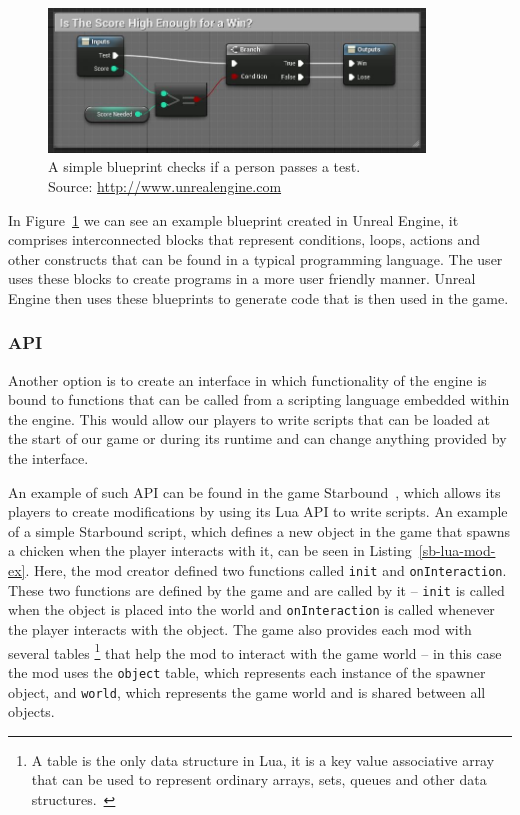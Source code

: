 \begin{figure}[H]
    \centering
    \includegraphics[width=10cm]{../img/blueprints.jpg}
    \caption{A simple blueprint checks if a person passes a test.
             \\Source: \href{http://docs.unrealengine.com/latest/images/Engine/Blueprints/UserGuide/Macros/score\_comparison\_example\_macro.jpg}
             {http://www.unrealengine.com}}
    \label{ue-blueprints}
\end{figure}

In Figure~\ref{ue-blueprints} we can see an example blueprint created in Unreal Engine, it comprises interconnected blocks that represent
conditions, loops, actions and other constructs that can be found in a typical programming language. The user uses these blocks to
create programs in a more user friendly manner. Unreal Engine then uses these blueprints to generate \cpp code that is then used in the game.

\subsubsection{API}

Another option is to create an interface in which functionality of the engine is bound to functions that can be called
from a scripting language embedded within the engine. This would allow our players to write scripts that can be loaded at the
start of our game or during its runtime and can change anything provided by the interface.

An example of such API can be found in the game Starbound~\cite{Starbound}, which allows its
players to create modifications by using its Lua API to write scripts. An example of a simple Starbound script,
which defines a new object in the game that spawns a chicken when the player interacts with it,
can be seen in Listing~\ref{sb-lua-mod-ex}. Here, the mod creator defined two functions called \texttt{init} and
\texttt{onInteraction}. These two functions are defined by the game and are called by it
-- \texttt{init} is called when the object is placed into the world and \texttt{onInteraction} is called
whenever the player interacts with the object. The game also provides each mod with several tables
\footnote{A table is the only data structure in Lua, it is a key value associative array that can be used to represent
ordinary arrays, sets, queues and other data structures.~\cite{PIL}}
that help the mod to interact with the game world -- in this case the mod uses the \texttt{object} table, which
represents each instance of the spawner object, and \texttt{world}, which represents the game world and
is shared between all objects.

